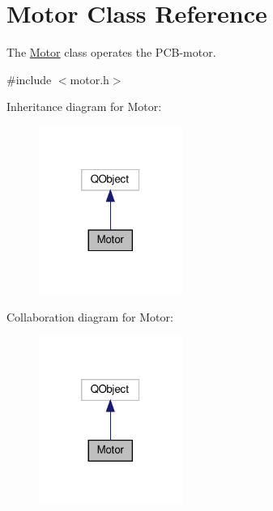 \hypertarget{classMotor}{}\section{Motor Class Reference}
\label{classMotor}


The \hyperlink{classMotor}{Motor} class operates the P\+C\+B-\/motor.  




{\ttfamily \#include $<$motor.\+h$>$}



Inheritance diagram for Motor\+:\nopagebreak
\begin{figure}[H]
\begin{center}
\leavevmode
\includegraphics[width=133pt]{classMotor__inherit__graph}
\end{center}
\end{figure}


Collaboration diagram for Motor\+:\nopagebreak
\begin{figure}[H]
\begin{center}
\leavevmode
\includegraphics[width=133pt]{classMotor__coll__graph}
\end{center}
\end{figure}
